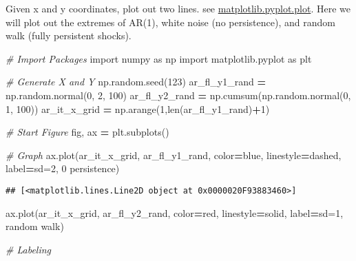 \documentclass[
]{book}
\newenvironment{Shaded}{\begin{snugshade}}{\end{snugshade}}
\newcommand{\BuiltInTok}[1]{#1}
\newcommand{\CommentTok}[1]{\textcolor[rgb]{0.56,0.35,0.01}{\textit{#1}}}
\newcommand{\DecValTok}[1]{\textcolor[rgb]{0.00,0.00,0.81}{#1}}
\newcommand{\ImportTok}[1]{#1}
\newcommand{\NormalTok}[1]{#1}
\newcommand{\OperatorTok}[1]{\textcolor[rgb]{0.81,0.36,0.00}{\textbf{#1}}}
\newcommand{\StringTok}[1]{\textcolor[rgb]{0.31,0.60,0.02}{#1}}
\begin{document}
Given x and y coordinates, plot out two lines. see \href{https://matplotlib.org/2.1.1/api/_as_gen/matplotlib.pyplot.plot.html}{matplotlib.pyplot.plot}. Here we will plot out the extremes of AR(1), white noise (no persistence), and random walk (fully persistent shocks).

\begin{Shaded}
\begin{Highlighting}[]
\CommentTok{\# Import Packages}
\ImportTok{import}\NormalTok{ numpy }\ImportTok{as}\NormalTok{ np}
\ImportTok{import}\NormalTok{ matplotlib.pyplot }\ImportTok{as}\NormalTok{ plt}

\CommentTok{\# Generate X and Y}
\NormalTok{np.random.seed(}\DecValTok{123}\NormalTok{)}
\NormalTok{ar\_fl\_y1\_rand }\OperatorTok{=}\NormalTok{ np.random.normal(}\DecValTok{0}\NormalTok{, }\DecValTok{2}\NormalTok{, }\DecValTok{100}\NormalTok{)}
\NormalTok{ar\_fl\_y2\_rand }\OperatorTok{=}\NormalTok{ np.cumsum(np.random.normal(}\DecValTok{0}\NormalTok{, }\DecValTok{1}\NormalTok{, }\DecValTok{100}\NormalTok{))}
\NormalTok{ar\_it\_x\_grid }\OperatorTok{=}\NormalTok{ np.arange(}\DecValTok{1}\NormalTok{,}\BuiltInTok{len}\NormalTok{(ar\_fl\_y1\_rand)}\OperatorTok{+}\DecValTok{1}\NormalTok{)}

\CommentTok{\# Start Figure}
\NormalTok{fig, ax }\OperatorTok{=}\NormalTok{ plt.subplots()}

\CommentTok{\# Graph}
\NormalTok{ax.plot(ar\_it\_x\_grid, ar\_fl\_y1\_rand,}
\NormalTok{                     color}\OperatorTok{=}\StringTok{\textquotesingle{}blue\textquotesingle{}}\NormalTok{, linestyle}\OperatorTok{=}\StringTok{\textquotesingle{}dashed\textquotesingle{}}\NormalTok{,}
\NormalTok{                     label}\OperatorTok{=}\StringTok{\textquotesingle{}sd=2, 0 persistence\textquotesingle{}}\NormalTok{)}
\end{Highlighting}
\end{Shaded}

\begin{verbatim}
## [<matplotlib.lines.Line2D object at 0x0000020F93883460>]
\end{verbatim}

\begin{Shaded}
\begin{Highlighting}[]
\NormalTok{ax.plot(ar\_it\_x\_grid, ar\_fl\_y2\_rand,}
\NormalTok{                     color}\OperatorTok{=}\StringTok{\textquotesingle{}red\textquotesingle{}}\NormalTok{, linestyle}\OperatorTok{=}\StringTok{\textquotesingle{}solid\textquotesingle{}}\NormalTok{,}
\NormalTok{                     label}\OperatorTok{=}\StringTok{\textquotesingle{}sd=1, random walk\textquotesingle{}}\NormalTok{)}
                     
\CommentTok{\# Labeling}
\end{Highlighting}
\end{Shaded}
\end{document}
